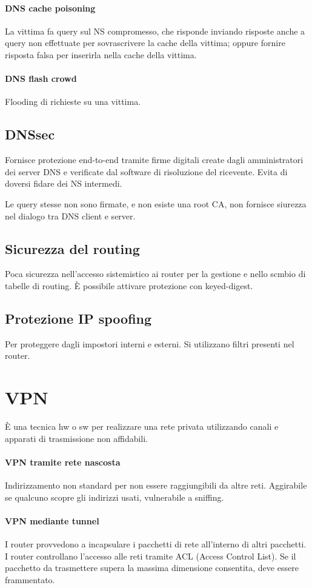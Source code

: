 \documentclass[11pt]{article}
\begin{document}
\paragraph*{DNS cache poisoning}
La vittima fa query sul NS compromesso, che risponde inviando risposte anche a query non effettuate per sovrascrivere la 
cache della vittima; oppure fornire risposta falsa per inserirla nella cache della vittima.
\paragraph*{DNS flash crowd}
Flooding di richieste su una vittima.
\subsection{DNSsec}
Fornisce protezione end-to-end tramite firme digitali create dagli amministratori dei server DNS e verificate dal software 
di risoluzione del ricevente. Evita di doversi fidare dei NS intermedi.

Le query stesse non sono firmate, e non esiste una root CA, non fornisce siurezza nel dialogo tra DNS client e server.
\subsection{Sicurezza del routing}
Poca sicurezza nell'accesso sistemistico ai router per la gestione e nello scmbio di tabelle di routing. È possibile attivare
protezione con keyed-digest.
\subsection{Protezione IP spoofing}
Per proteggere dagli impostori interni e esterni. Si utilizzano filtri presenti nel router.
\section{VPN}
È una tecnica hw o sw per realizzare una rete privata utilizzando canali e apparati di trasmissione non affidabili. 
\paragraph*{VPN tramite rete nascosta}
Indirizzamento non standard per non essere raggiungibili da altre reti. Aggirabile se qualcuno scopre gli indirizzi usati,
vulnerabile a sniffing.
\paragraph*{VPN mediante tunnel}
I router provvedono a incapsulare i pacchetti di rete all'interno di altri pacchetti. I router controllano l'accesso alle 
reti tramite ACL (Access Control List).
Se il pacchetto da trasmettere supera la massima dimensione consentita, deve essere frammentato.
\end{document}
